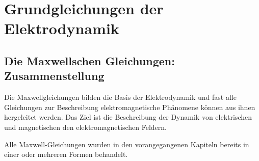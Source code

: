 

\chapter{Grundgleichungen der Elektrodynamik}

\section{Die Maxwellschen Gleichungen: Zusammenstellung}

Die Maxwellgleichungen bilden die Basis der Elektrodynamik und fast alle Gleichungen zur Beschreibung elektromagnetische Phänomene können aus ihnen hergeleitet werden. Das Ziel ist die Beschreibung der Dynamik von elektrischen und magnetischen \textendash{} den elektromagnetischen \textendash{} Feldern.

Alle Maxwell-Gleichungen wurden in den vorangegangenen Kapiteln bereits in einer oder mehreren Formen behandelt.

